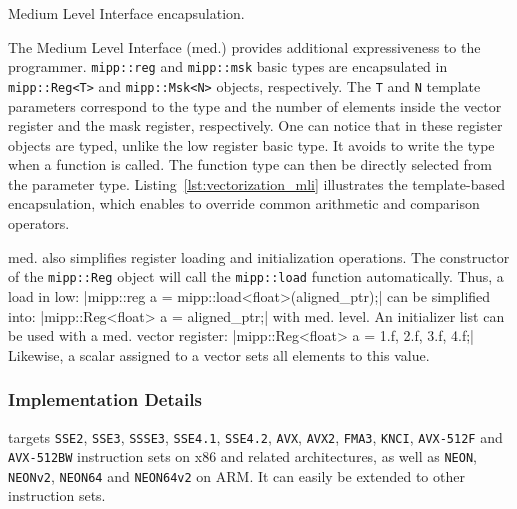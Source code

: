 \begin{listing}
  \inputminted[frame=lines,linenos]{C++}{main/chapter2/src/vectorization/mipp_mli.cpp}
  \caption{Medium Level Interface encapsulation.}
  \label{lst:vectorization_mli}
\end{listing}

The \MIPP Medium Level Interface (\MIPP med.) provides additional expressiveness
to the programmer. \verb|mipp::reg| and \verb|mipp::msk| basic types are
encapsulated in \verb|mipp::Reg<T>| and \verb|mipp::Msk<N>| objects,
respectively. The \verb|T| and \verb|N| template parameters correspond to the
type and the number of elements inside the vector register and the mask
register, respectively. One can notice that in these register objects are typed,
unlike the \MIPP low register basic type. It avoids to write the type when a
\MIPP function is called. The function type can then be directly selected from
the parameter type. Listing~\ref{lst:vectorization_mli} illustrates the
template-based encapsulation, which enables \MIPP to override common arithmetic
and comparison operators.

\MIPP med. also simplifies register loading and initialization operations. The
constructor of the \verb|mipp::Reg| object will call the \verb|mipp::load|
function automatically. Thus, a load in \MIPP low:
|mipp::reg a = mipp::load<float>(aligned_ptr);|
can be simplified into:
|mipp::Reg<float> a = aligned_ptr;|
with \MIPP med. level. An initializer list
can be used with a \MIPP med. vector register:
|mipp::Reg<float> a = {1.f, 2.f, 3.f, 4.f};|
Likewise, a scalar assigned to a vector sets all elements to
this value.

\subsubsection{Implementation Details}
\label{sec:vectorization_implem}

\MIPP targets \verb|SSE2|, \verb|SSE3|, \verb|SSSE3|, \verb|SSE4.1|,
\verb|SSE4.2|, \verb|AVX|, \verb|AVX2|, \verb|FMA3|, \verb|KNCI|,
\verb|AVX-512F| and \verb|AVX-512BW| instruction sets on x86 and related
architectures, as well as \verb|NEON|, \verb|NEONv2|, \verb|NEON64| and
\verb|NEON64v2| on ARM\R. It can easily be extended to other instruction sets.

